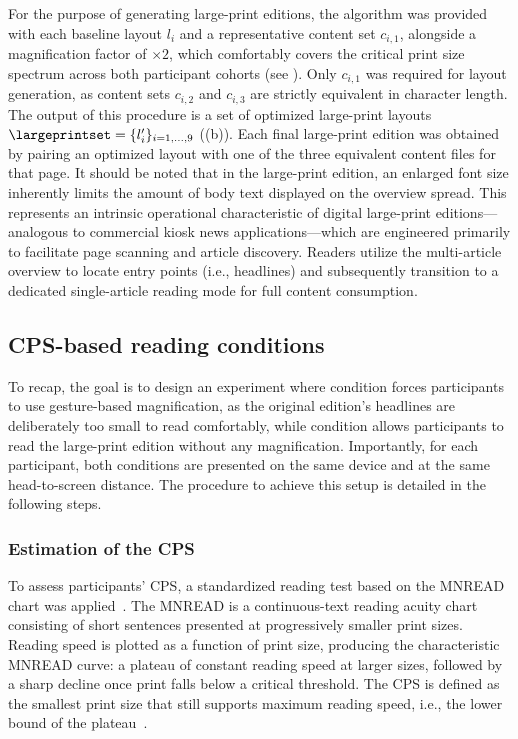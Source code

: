 For the purpose of generating large-print editions, the algorithm was provided with each baseline layout $l_i$ and a representative content set $c_{i,1}$, alongside a magnification factor of $\times 2$, which comfortably covers the critical print size spectrum across both participant cohorts (see ). Only $c_{i,1}$ was required for layout generation, as content sets $c_{i,2}$ and $c_{i,3}$ are strictly equivalent in character length. The output of this procedure is a set of optimized large-print layouts $\largeprintset = \{l'_i\}_{i=1,\dots,9}$ ((b)). Each final large-print edition was obtained by pairing an optimized layout with one of the three equivalent content files for that page. It should be noted that in the large-print edition, an enlarged font size inherently limits the amount of body text displayed on the overview spread. This represents an intrinsic operational characteristic of digital large-print editions---analogous to commercial kiosk news applications---which are engineered primarily to facilitate page scanning and article discovery. Readers utilize the multi-article overview to locate entry points (i.e., headlines) and subsequently transition to a dedicated single-article reading mode for full content consumption.


\subsection{CPS-based reading conditions}
\label{sec:condition-definition}

To recap, the goal is to design an experiment where condition \condonenot forces participants to use gesture-based magnification, as the original edition's headlines are deliberately too small to read comfortably, while condition \condtwonot allows participants to read the large-print edition without any magnification. Importantly, for each participant, both conditions are presented on the same device and at the same head-to-screen distance. The procedure to achieve this setup is detailed in the following steps.

\subsubsection{Estimation of the CPS}

To assess participants' CPS,  a standardized reading test based on the MNREAD chart was applied~\cite{legge1992psychophysics,mansfield1993}. The MNREAD is a continuous-text reading acuity chart consisting of short sentences presented at progressively smaller print sizes. Reading speed is plotted as a function of print size, producing the characteristic MNREAD curve: a plateau of constant reading speed at larger sizes, followed by a sharp decline once print falls below a critical threshold. The CPS is defined as the smallest print size that still supports maximum reading speed, i.e., the lower bound of the plateau~\cite{legge2006}.

